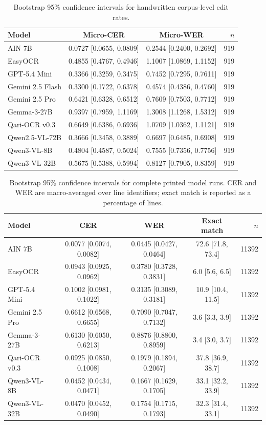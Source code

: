 \begin{table}[t]
\centering
\caption{Bootstrap 95\% confidence intervals for handwritten corpus-level edit rates.}
\label{tab:app_ci_handwritten_micro}
\small
\setlength{\tabcolsep}{3.5pt}
\begin{tabular}{lccr}
\toprule
Model & Micro-CER & Micro-WER & $n$ \\
\midrule
AIN 7B & 0.0727 [0.0655, 0.0809] & 0.2544 [0.2400, 0.2692] & 919 \\
EasyOCR & 0.4855 [0.4767, 0.4946] & 1.1007 [1.0869, 1.1152] & 919 \\
GPT-5.4 Mini & 0.3366 [0.3259, 0.3475] & 0.7452 [0.7295, 0.7611] & 919 \\
Gemini 2.5 Flash & 0.3300 [0.1722, 0.6378] & 0.4574 [0.4386, 0.4760] & 919 \\
Gemini 2.5 Pro & 0.6421 [0.6328, 0.6512] & 0.7609 [0.7503, 0.7712] & 919 \\
Gemma-3-27B & 0.9397 [0.7959, 1.1169] & 1.3008 [1.1268, 1.5312] & 919 \\
Qari-OCR v0.3 & 0.6649 [0.6386, 0.6936] & 1.0709 [1.0362, 1.1121] & 919 \\
Qwen2.5-VL-72B & 0.3666 [0.3458, 0.3889] & 0.6697 [0.6485, 0.6908] & 919 \\
Qwen3-VL-8B & 0.4804 [0.4587, 0.5024] & 0.7555 [0.7356, 0.7756] & 919 \\
Qwen3-VL-32B & 0.5675 [0.5388, 0.5994] & 0.8127 [0.7905, 0.8359] & 919 \\
\bottomrule
\end{tabular}
\end{table}

\begin{table}[t]
\centering
\caption{Bootstrap 95\% confidence intervals for complete printed model runs. CER and WER are macro-averaged over line identifiers; exact match is reported as a percentage of lines.}
\label{tab:app_ci_printed_macro}
\small
\setlength{\tabcolsep}{3.5pt}
\begin{tabular}{lcccr}
\toprule
Model & CER & WER & Exact match & $n$ \\
\midrule
AIN 7B & 0.0077 [0.0074, 0.0082] & 0.0445 [0.0427, 0.0464] & 72.6 [71.8, 73.4] & 11392 \\
EasyOCR & 0.0943 [0.0925, 0.0962] & 0.3780 [0.3728, 0.3831] & 6.0 [5.6, 6.5] & 11392 \\
GPT-5.4 Mini & 0.1002 [0.0981, 0.1022] & 0.3135 [0.3089, 0.3181] & 10.9 [10.4, 11.5] & 11392 \\
Gemini 2.5 Pro & 0.6612 [0.6568, 0.6655] & 0.7090 [0.7047, 0.7132] & 3.6 [3.3, 3.9] & 11392 \\
Gemma-3-27B & 0.6130 [0.6050, 0.6213] & 0.8876 [0.8800, 0.8959] & 3.4 [3.0, 3.7] & 11392 \\
Qari-OCR v0.3 & 0.0925 [0.0850, 0.1008] & 0.1979 [0.1894, 0.2067] & 37.8 [36.9, 38.7] & 11392 \\
Qwen3-VL-8B & 0.0452 [0.0434, 0.0471] & 0.1667 [0.1629, 0.1705] & 33.1 [32.2, 33.9] & 11392 \\
Qwen3-VL-32B & 0.0470 [0.0452, 0.0490] & 0.1754 [0.1715, 0.1793] & 32.3 [31.4, 33.1] & 11392 \\
\bottomrule
\end{tabular}
\end{table}

